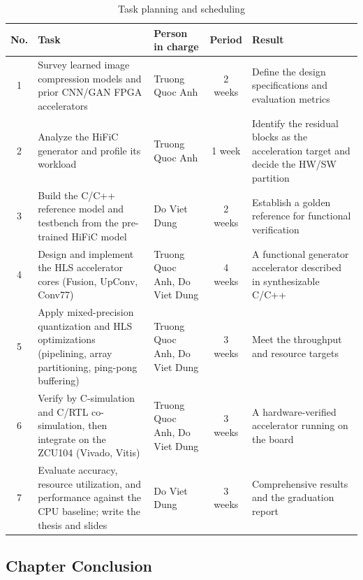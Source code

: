 \begin{table}[H]
\centering
\caption{Task planning and scheduling}
\label{tab:task_planning}
\renewcommand{\arraystretch}{1.2}
\small
\begin{tabularx}{\textwidth}{|c|>{\raggedright\arraybackslash}p{}|>{\raggedright\arraybackslash}p{}|c|X|}
\hline
\textbf{No.} & \textbf{Task} & \textbf{Person in charge} & \textbf{Period} & \textbf{Result} \\
\hline
1 & Survey learned image compression models and prior CNN/GAN FPGA accelerators & Truong Quoc Anh & 2 weeks & Define the design specifications and evaluation metrics \\
\hline
2 & Analyze the HiFiC generator and profile its workload & Truong Quoc Anh & 1 week & Identify the residual blocks as the acceleration target and decide the HW/SW partition \\
\hline
3 & Build the C/C++ reference model and testbench from the pre-trained HiFiC model & Do Viet Dung & 2 weeks & Establish a golden reference for functional verification \\
\hline
4 & Design and implement the HLS accelerator cores (Fusion, UpConv, Conv77) & Truong Quoc Anh, Do Viet Dung & 4 weeks & A functional generator accelerator described in synthesizable C/C++ \\
\hline
5 & Apply mixed-precision quantization and HLS optimizations (pipelining, array partitioning, ping-pong buffering) & Truong Quoc Anh, Do Viet Dung & 3 weeks & Meet the throughput and resource targets \\
\hline
6 & Verify by C-simulation and C/RTL co-simulation, then integrate on the ZCU104 (Vivado, Vitis) & Truong Quoc Anh, Do Viet Dung & 3 weeks & A hardware-verified accelerator running on the board \\
\hline
7 & Evaluate accuracy, resource utilization, and performance against the CPU baseline; write the thesis and slides & Do Viet Dung & 3 weeks & Comprehensive results and the graduation report \\
\hline
\end{tabularx}
\end{table}

\subsection{Chapter Conclusion}


